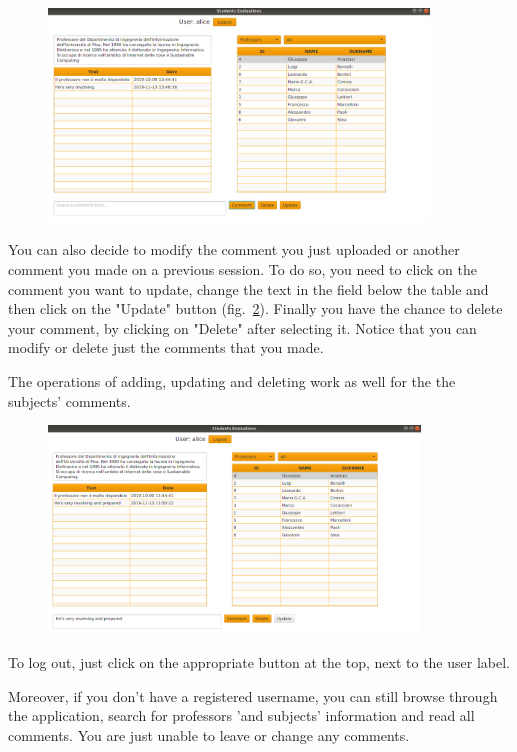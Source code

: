 \documentclass[a4paper, oneside]{article}
\begin{document}
\begin{figure}
\centering
\includegraphics[width=0.9\textwidth]{images/screens/screen4}
\label{fig:screen4}
\end{figure}

You can also decide to modify the comment you just uploaded or another comment you made on a previous session. To do so, you need to click on the comment you want to update, change the text in the field below the table and then click on the "Update" button (fig.~\ref{fig:screen5}).
Finally you have the chance to delete your comment, by clicking on "Delete" after selecting it. Notice that you can modify or delete just the comments that you made.

The operations of adding, updating and deleting work as well for the the subjects' comments.
\begin{figure}[h]
\centering
\includegraphics[width=0.88\textwidth]{images/screens/screen5}
\label{fig:screen5}
\end{figure}

To log out, just click on the appropriate button at the top, next to the user label.

Moreover, if you don't have a registered username, you can still browse through the application, search for professors 'and subjects' information and read all comments. You are just unable to leave or change any comments.
\end{document}
